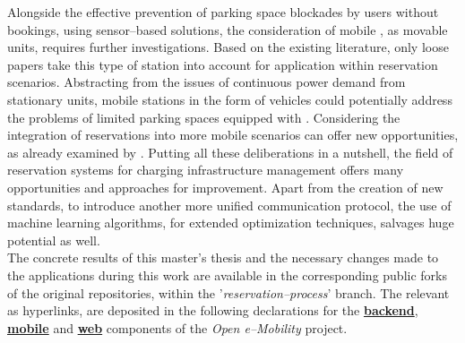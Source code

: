 Alongside the effective prevention of parking space blockades by users without bookings, using sensor--based solutions, the consideration of mobile , as movable units, requires further investigations. 
Based on the existing literature, only loose papers take this type of station into account for application within reservation scenarios. 
Abstracting from the issues of continuous power demand from stationary units, mobile stations in the form of vehicles could potentially address the problems of limited parking spaces equipped with . 
Considering the integration of reservations into more mobile scenarios can offer new opportunities, as already examined by \cite{zhang_mobile_2020}.
Putting all these deliberations in a nutshell, the field of reservation systems for charging infrastructure management offers many opportunities and approaches for improvement. 
Apart from the creation of new standards, to introduce another more unified communication protocol, the use of machine learning algorithms, for extended optimization techniques, salvages huge potential as well. \\
The concrete results of this master's thesis and the necessary changes made to the applications during this work are available in the corresponding public forks of the original repositories, within the '\textit{reservation--process}' branch. 
The relevant  as hyperlinks, are deposited in the following declarations for the \href{https://github.com/JulianHBuecher/ev-server/tree/reservation-process}{\textbf{backend}}, \href{https://github.com/JulianHBuecher/ev-mobile/tree/reservation-process}{\textbf{mobile}} and \href{https://github.com/JulianHBuecher/ev-dashboard/tree/reservation-process}{\textbf{web}} components of the \textit{Open e--Mobility} project. 
